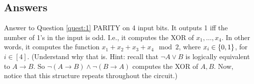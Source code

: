 \subsection{Answers}








\begin{trailer}{Answer to Question \ref{quest:1}}\label{trailer:xor-circuit}
     PARITY on 4 input bits. It outputs 1 iff the number of 1's in the input is odd. I.e., it computes the XOR of $x_1, \ldots, x_4$. In other words, it computes the function $x_1+x_2+x_3+x_4 \mod 2$, where $x_i\in\{0,1\}$, for $i\in[4]$. (Understand why that is. Hint: recall that ${\neg A}\lor B$ is logically equivalent to $A\to B$. So $\neg (A\to B) \land \neg(B\to A)$ computes the XOR of $A, B$. Now, notice that this structure repeats throughout the circuit.)
\end{trailer}



